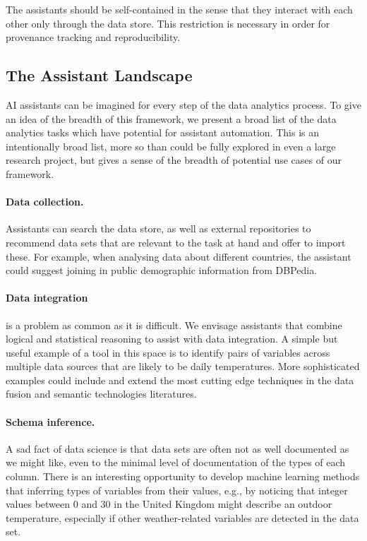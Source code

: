 \documentclass[sigplan,preprint,10pt]{acmart}\settopmatter{printfolios=true,printccs=false,printacmref=false}
\begin{document}
{\medskip \noindent
The assistants should be self-contained in the sense that they interact with each other
only through the
data store. This restriction is necessary in order
for provenance tracking and reproducibility.



\subsection{The Assistant Landscape}
{

AI assistants can be imagined for every step of the data analytics process.
To give an idea of the breadth of this framework,
we present a broad list of the data analytics tasks which have potential for assistant automation.
This is an intentionally broad list, more so than
could be fully explored in even a large research project, but gives a sense of the breadth of
potential use cases of our framework.

\paragraph{Data collection.} Assistants can search the data store, as well as external repositories
to recommend data sets that are relevant to the task at hand and offer to import these. For example,
when analysing data about different countries,
the assistant could suggest joining in public
demographic information from DBPedia.

\paragraph{Data integration} is a problem as common
as it is difficult. We envisage assistants
that combine logical and statistical reasoning to assist
with data  integration. A simple but useful
example of a tool in this space is to
 identify pairs of variables across multiple data
sources that are likely to be daily temperatures.
More sophisticated examples could include and extend the
most cutting edge techniques in the data fusion and
semantic technologies literatures.

\paragraph{Schema inference.} A sad fact of data
science is that data sets are often not as well documented
as we might like, even to the minimal level of
documentation of the types of each column.
There is an interesting opportunity to
develop machine learning methods that inferring types of variables from their values, e.g.,
by noticing that integer values between 0 and 30 in
the United Kingdom might describe an outdoor temperature, especially if other weather-related
variables are detected in the data set.

}}
\end{document}
